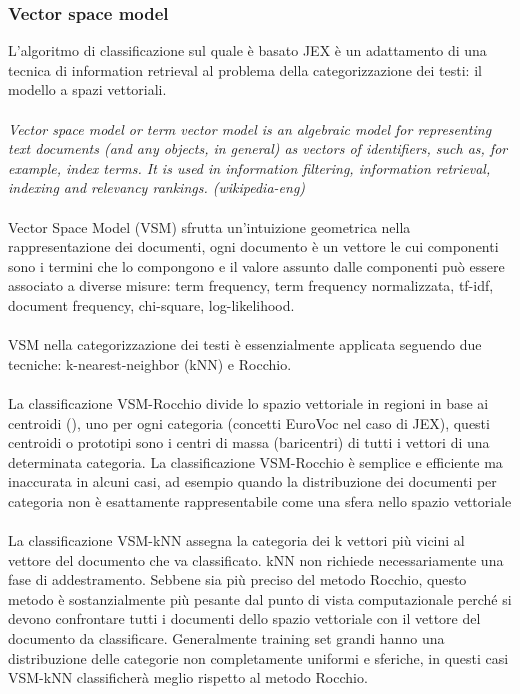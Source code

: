 \documentclass{article}
\theoremstyle{plain}
\theoremstyle{definition}
\begin{document}
\subsubsection{Vector space model}
L'algoritmo di classificazione sul quale è basato JEX è un adattamento di una tecnica di information retrieval al problema della categorizzazione dei testi: il modello a spazi vettoriali. 
\\
\\
\textit{
Vector space model or term vector model is an algebraic model for representing text documents (and any objects, in general) as vectors of identifiers, such as, for example, index terms. It is used in information filtering, information retrieval, indexing and relevancy rankings. (wikipedia-eng)
}
\\
\\
Vector Space Model (VSM) sfrutta un'intuizione geometrica nella rappresentazione dei documenti, ogni documento è un vettore le cui componenti sono i termini che lo compongono e il valore assunto dalle componenti può essere associato a diverse misure: term frequency, term frequency normalizzata, tf-idf, document frequency, chi-square, log-likelihood.
\\
\\  
VSM nella categorizzazione dei testi è essenzialmente applicata seguendo due tecniche: k-nearest-neighbor (kNN) e Rocchio.\footnotemark
{}
\\
\\
La classificazione VSM-Rocchio divide lo spazio vettoriale in regioni in base ai centroidi (), uno per ogni categoria (concetti EuroVoc nel caso di JEX), questi centroidi o prototipi sono i centri di massa (baricentri) di tutti i vettori di una determinata categoria. La classificazione VSM-Rocchio è semplice e efficiente ma inaccurata in alcuni casi, ad esempio quando la distribuzione dei documenti per categoria non è esattamente rappresentabile come una sfera nello spazio vettoriale
\\
\\
La classificazione VSM-kNN assegna la categoria dei k vettori più vicini al vettore del documento che va classificato. kNN non richiede necessariamente una fase di addestramento. Sebbene sia più preciso del metodo Rocchio, questo metodo è sostanzialmente più pesante dal punto di vista computazionale perché si devono confrontare tutti i documenti dello spazio vettoriale con il vettore del documento da classificare. Generalmente training set grandi hanno una distribuzione delle categorie non completamente uniformi e sferiche, in questi casi VSM-kNN classificherà meglio rispetto al metodo Rocchio.
\end{document}
